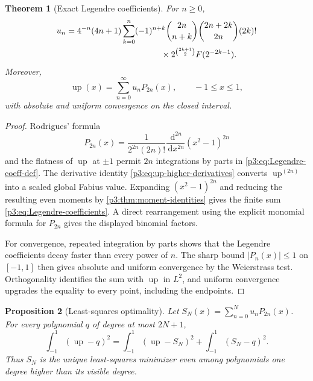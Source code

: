 \documentclass[11pt]{article}
\numberwithin{equation}{section}
\newtheorem{theorem}{Theorem}[section]
\newtheorem{proposition}[theorem]{Proposition}
\theoremstyle{definition}
\theoremstyle{remark}
\newcommand{\upf}{\operatorname{up}}
\newcommand{\dd}{\,\mathrm d}
\begin{document}
\begin{theorem}[Exact Legendre coefficients]\label{p3:thm:Legendre-coefficients}
For $n\ge0$,
\begin{equation}\label{p3:eq:Legendre-coefficients}
\begin{split}
 u_n={}&4^{-n}(4n+1)\sum_{k=0}^{n}(-1)^{n+k}
 \binom{2n}{n+k}\binom{2n+2k}{2n}(2k)!\\
 &\hspace{35mm}\times 2^{\binom{2k+1}{2}}F(2^{-2k-1}).
\end{split}
\end{equation}
Moreover,
\begin{equation}\label{p3:eq:Legendre-series}
 \upf(x)=\sum_{n=0}^{\infty}u_nP_{2n}(x),\qquad -1\le x\le1,
\end{equation}
with absolute and uniform convergence on the closed interval.
\end{theorem}

\begin{proof}
Rodrigues' formula
\[
 P_{2n}(x)=\frac{1}{2^{2n}(2n)!}\frac{\dd^{2n}}{\dd x^{2n}}(x^2-1)^{2n}
\]
and the flatness of $\upf$ at $\pm1$ permit $2n$ integrations by parts in \eqref{p3:eq:Legendre-coeff-def}.  The derivative identity \eqref{p3:eq:up-higher-derivatives} converts $\upf^{(2n)}$ into a scaled global Fabius value.  Expanding $(x^2-1)^{2n}$ and reducing the resulting even moments by \cref{p3:thm:moment-identities} gives the finite sum \eqref{p3:eq:Legendre-coefficients}.  A direct rearrangement using the explicit monomial formula for $P_{2n}$ gives the displayed binomial factors.

For convergence, repeated integration by parts shows that the Legendre coefficients decay faster than every power of $n$.  The sharp bound $|P_n(x)|\le1$ on $[-1,1]$ then gives absolute and uniform convergence by the Weierstrass test.  Orthogonality identifies the sum with $\upf$ in $L^2$, and uniform convergence upgrades the equality to every point, including the endpoints.
\end{proof}

\begin{proposition}[Least-squares optimality]\label{p3:prop:Legendre-least-squares}
Let $S_N(x)=\sum_{n=0}^{N}u_nP_{2n}(x)$.  For every polynomial $q$ of degree at most $2N+1$,
\begin{equation}\label{p3:eq:Legendre-Pythagorean}
 \int_{-1}^{1}(\upf-q)^2
 =\int_{-1}^{1}(\upf-S_N)^2+\int_{-1}^{1}(S_N-q)^2.
\end{equation}
Thus $S_N$ is the unique least-squares minimizer even among polynomials one degree higher than its visible degree.
\end{proposition}
\end{document}
